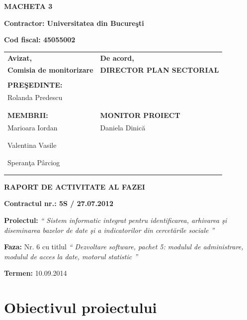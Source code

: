 \documentclass[a4paper, 10pt]{article}
\title{}
\author{}
\date{2013-04-08}
\begin{document}
{\raggedleft\bfseries
MACHETA 3
\par}

{\bfseries
Contractor: Universitatea din Bucure\c{s}ti}

{\textbf{Cod fiscal: 45055002}

\bigskip


\begin{tabular}{@{}l l}
\textbf{Avizat,}&\textbf{De acord,}\\
\textbf{Comisia de monitorizare}&\textbf{DIRECTOR PLAN SECTORIAL}\\
\\
\textbf{PRE\c{S}EDINTE:}&\\
Rolanda Predescu&\\
\\
\\
\textbf{MEMBRII:}&\textbf{MONITOR PROIECT}\\
Marioara Iordan&Daniela Dinic\u{a}\\
\\
\\
Valentina Vasile&\\
\\
\\
Speran\c{t}a P\^{a}rciog\\
\\
\\
\end{tabular}

\bigskip

\bigskip

{\centering\bfseries
RAPORT DE ACTIVITATE AL FAZEI
\par}

\bigskip

{\bfseries
Contractul nr.: 5S / 27.07.2012}

{
\textbf{Proiectul: }
\textit{`` Sistem informatic integrat pentru identificarea, arhivarea \c{s}i diseminarea bazelor de date \c{s}i a indicatorilor din
cercet\u{a}rile sociale ''}}

{
\textbf{Faza: }
Nr. 6 cu titlul 
\textit{`` Dezvoltare software, pachet 5: modulul de administrare, modulul de acces la date, motorul statistic ''}}

{\textbf{Termen:} 10.09.2014}

\medskip

\section{Obiectivul proiectului}

}
\end{document}
